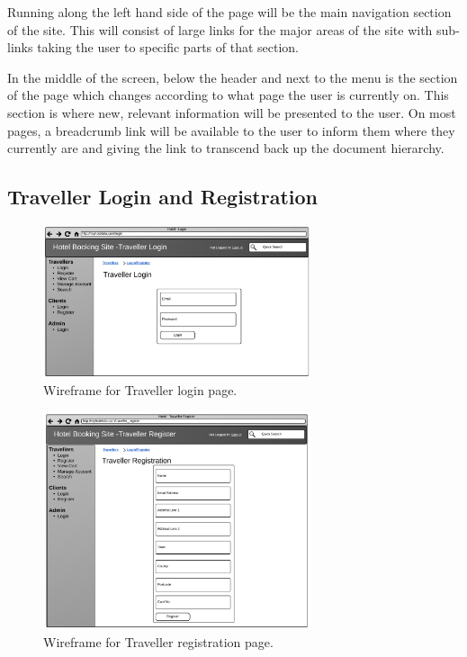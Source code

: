 \documentclass{article}
\begin{document}
Running along the left hand side of the page will be the main navigation section of the site. This will consist of large links for the major areas of the site with sub-links taking the user to specific parts of that section.

In the middle of the screen, below the header and next to the menu is the section of the page which changes according to what page the user is currently on. This section is where new, relevant information will be presented to the user. On most pages, a breadcrumb link will be available to the user to inform them where they currently are and giving the link to transcend back up the document hierarchy.

\subsection{Traveller Login and Registration}

\begin{figure}[H]
\centering
\includegraphics[width=0.7\textwidth]{img/wireframes/Login.png}
\caption{Wireframe for Traveller login page.}
\label{fig:wireframe-traveller-login}
\end{figure}

\begin{figure}[H]
\centering
\includegraphics[width=0.7\textwidth]{img/wireframes/TravellerRegistration.png}
\caption{Wireframe for Traveller registration page.}
\label{fig:wireframe-traveller-register}
\end{figure}
\end{document}
